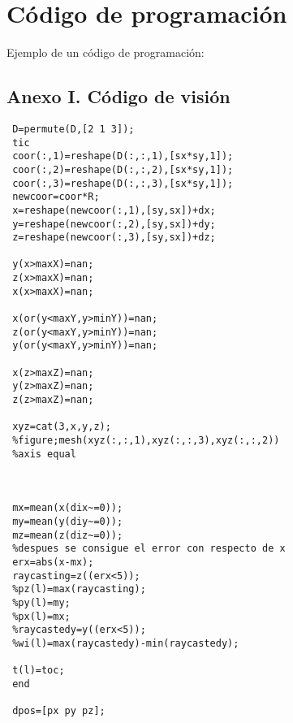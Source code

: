 
\chapter{Código de programación}\label{codigo}

Ejemplo de un código de programación:

\section{Anexo I. Código de visión}\label{visioncode}
 \begin{lstlisting}
 D=permute(D,[2 1 3]);
 tic
 coor(:,1)=reshape(D(:,:,1),[sx*sy,1]);
 coor(:,2)=reshape(D(:,:,2),[sx*sy,1]);
 coor(:,3)=reshape(D(:,:,3),[sx*sy,1]);
 newcoor=coor*R;
 x=reshape(newcoor(:,1),[sy,sx])+dx;
 y=reshape(newcoor(:,2),[sy,sx])+dy;
 z=reshape(newcoor(:,3),[sy,sx])+dz;
 
 y(x>maxX)=nan;
 z(x>maxX)=nan;
 x(x>maxX)=nan;
 
 x(or(y<maxY,y>minY))=nan;
 z(or(y<maxY,y>minY))=nan;
 y(or(y<maxY,y>minY))=nan;
 
 x(z>maxZ)=nan;
 y(z>maxZ)=nan;
 z(z>maxZ)=nan;
 
 xyz=cat(3,x,y,z);
 %figure;mesh(xyz(:,:,1),xyz(:,:,3),xyz(:,:,2))
 %axis equal
 
 
 
 mx=mean(x(dix~=0));
 my=mean(y(diy~=0));
 mz=mean(z(diz~=0));
 %despues se consigue el error con respecto de x
 erx=abs(x-mx);
 raycasting=z((erx<5));
 %pz(l)=max(raycasting);
 %py(l)=my;
 %px(l)=mx;
 %raycastedy=y((erx<5));
 %wi(l)=max(raycastedy)-min(raycastedy);
 
 t(l)=toc;
 end
 
 dpos=[px py pz];
 \end{lstlisting}

